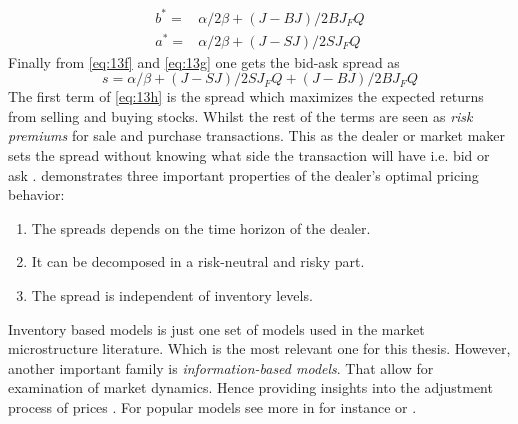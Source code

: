 \documentclass{kththesis}
\theoremstyle{definition}
\begin{document}
\begin{align}
\label{eq:13f}
    b^{*} = & \alpha/2\beta + (J-BJ)/2BJ_{F}Q \\
    a^{*} = & \alpha/2\beta + (J-SJ)/2SJ_{F}Q \label{eq:13g}
\end{align}
Finally from \autoref{eq:13f} and \autoref{eq:13g} one gets the bid-ask spread as
\begin{equation}
    \label{eq:13h}
    s = \alpha / \beta + (J-SJ)/2SJ_{F}Q + (J-BJ)/2BJ_{F}Q
\end{equation}
The first term of \autoref{eq:13h} is the spread which maximizes the expected returns from selling and buying stocks. Whilst the rest of the terms are seen as \textit{risk premiums} for sale and purchase transactions. This as the dealer or market maker sets the spread without knowing what side the transaction will have i.e. bid or ask \parencite{ho1981optimal}.
\newline
\newline
\textcite{ho1981optimal} demonstrates three important properties of the dealer's optimal pricing behavior:

\begin{enumerate}
    \item The spreads depends on the time horizon of the dealer. 
    \item It can be decomposed in a risk-neutral and risky part.
    \item The spread is independent of inventory levels.
\end{enumerate}
Inventory based models is just one set of models used in the market microstructure literature. Which is the most relevant one for this thesis. However, another important family is \textit{information-based models}. That allow for examination of market dynamics. Hence providing insights into the adjustment process of prices \parencite{o1995market}. For popular models see more in for instance \textcite{glosten1985bid} or \textcite{das2005learning, das2003intelligent}.

\end{document}
